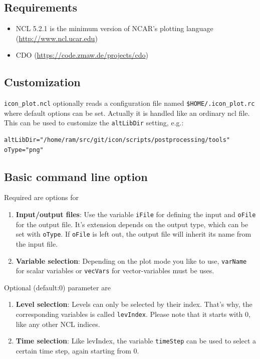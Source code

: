 \subsection{Requirements}
\begin{itemize}
\item NCL 5.2.1 is the minimum version of NCAR's plotting language (\href{http://www.ncl.ucar.edu}{http://www.ncl.ucar.edu})
\item CDO (\href{https://code.zmaw.de/projects/cdo}{https://code.zmaw.de/projects/cdo})
\end{itemize}

\subsection{Customization}
{\tt icon\_plot.ncl} optionally reads a configuration file named {\tt \$HOME/.icon\_plot.rc} where default options can be set. Actually it is handled like an ordinary ncl file. This can be used to customize the {\tt altLibDir} setting, e.g.:

\begin{small}
\begin{verbatim}
altLibDir="/home/ram/src/git/icon/scripts/postprocessing/tools" 
oType="png" 
\end{verbatim}
\end{small}

\subsection{Basic command line option}
Required are options for
\begin{enumerate}
\item \textbf{Input/output files}: Use the variable {\tt iFile} for defining the input and {\tt oFile} for the output file. It's extension depends on the output type, which can be set with {\tt oType}. If {\tt oFile} is left out, the output file will inherit its name from the input file.
\item \textbf{Variable selection}: Depending on the plot mode you like to use, {\tt varName} for scalar variables or {\tt vecVars} for vector-variables must be uses.
\end{enumerate}

Optional (default:0) parameter are
\begin{enumerate}
\item \textbf{Level selection}: Levels can only be selected by their index. That's why, the corresponding variables is called {\tt levIndex}. Please note that it starts with 0, like any other NCL indices.
\item \textbf{Time selection}: Like levIndex, the variable {\tt timeStep} can be used to select a certain time step, again starting from 0.
\end{enumerate}

